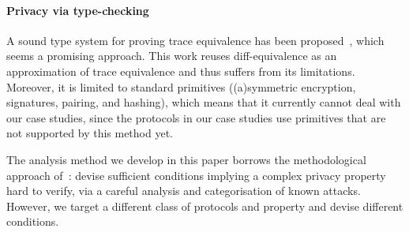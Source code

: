 \paragraph{\textbf{Privacy via type-checking}}
\label{sec:rel:typeChecking}
A sound type system for proving trace equivalence has
been proposed~\cite{cortier2017type}, which seems a promising approach.
This work reuses diff-equivalence as an approximation of trace
equivalence and thus suffers from its limitations.
Moreover, it is limited to standard primitives ((a)symmetric encryption,
signatures, pairing, and hashing),
which means that it currently cannot deal with our case studies, since
the protocols in our case studies use primitives that are not supported
by this method yet.

The analysis method we develop in this paper borrows the
methodological approach of~\cite{HBD-sp16}: devise sufficient conditions implying a complex privacy
property hard to verify, via a careful analysis and categorisation of known attacks.
However, we target a different class of protocols and property and devise different conditions.
%

